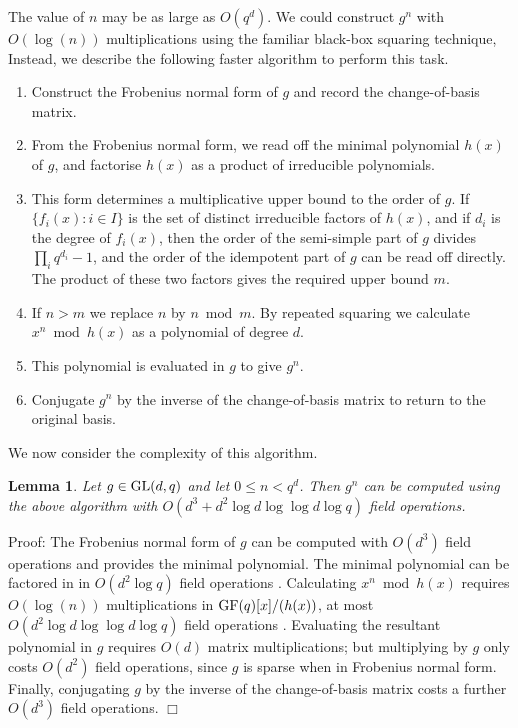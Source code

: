 \documentclass[12pt]{article}
\newtheorem{lemma}[definition]{Lemma}
\newenvironment{proof}{\normalsize {\sc Proof}:}{{\hfill $\Box$ \\}}
\def\GL{{\rm GL}}
\def\GF{{\rm GF}}
\begin{document}
The value of $n$ may be as large as $O(q^d)$. We
could construct $g^n$ with $O(\log(n))$ multiplications using the familiar
black-box squaring technique, 
Instead, we describe the following faster algorithm to perform this task.
\begin{enumerate}
\item 
Construct the Frobenius normal form of $g$ and record
the change-of-basis matrix. 

\item 
 From the Frobenius normal form, 
we read off the minimal polynomial
$h(x)$ of $g$, and factorise $h(x)$ 
as a product of irreducible polynomials.

\item 
This form determines a multiplicative upper bound
to the order of $g$. 
If $\{f_i(x):i\in I\}$ is the set of distinct
irreducible factors of $h(x)$, and if $d_i$ is the degree of
$f_i(x)$, then the order of the semi-simple part of $g$ divides
$\prod_iq^{d_i}-1$, and the order of the idempotent part of $g$ can be
read off directly. The product of these two factors  gives the
required upper bound $m$. 

\item If $n>m$ we replace $n$ by $n\bmod m$. 
By repeated squaring we calculate $x^n\bmod h(x)$ 
as a polynomial of degree $d$. 

\item This polynomial is evaluated in $g$ to give $g^n$. 

\item Conjugate $g^n$ by the inverse of the change-of-basis 
matrix to return to the original basis.
\end{enumerate}

We now consider the complexity of this algorithm.
\begin{lemma}Let $g\in\GL(d,q)$ and let $0\le n<q^d$. Then
$g^n$ can be computed using the above algorithm
with $O(d^3 + d^2 \log d \log \log d \log q)$ field operations.
\end{lemma}
\begin{proof}
The Frobenius normal form of $g$ can be computed with
$O(d^3)$ field operations \cite{Storjohann98}
and provides the minimal polynomial.
The minimal polynomial can be factored in 
in $O(d^2 \log q)$ field operations \cite[Theorem 14.14]{vzg}.
Calculating $x^n \bmod h(x)$ requires $O(\log(n))$
multiplications in $\GF(q)[x]/(h(x))$, 
at most $O(d^2 \log d \log \log d \log q)$ 
field operations \cite{vzg}. Evaluating the resultant polynomial in $g$ requires
$O(d)$ matrix multiplications;  but multiplying by   
$g$ only costs $O(d^2)$ field operations, since $g$ is sparse when 
in Frobenius normal form. Finally, conjugating $g$ by the inverse of 
the change-of-basis matrix costs a further $O(d^3)$ field operations.
\end{proof}
\end{document}
